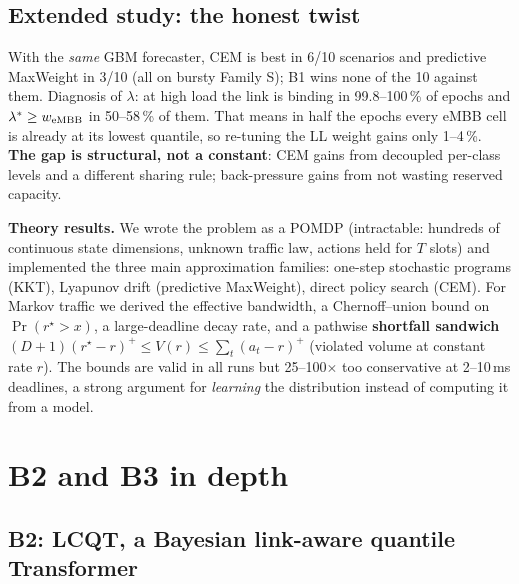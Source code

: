 \documentclass[11pt,a4paper]{article}
\newcommand{\rstar}{r^\star}
\begin{document}
\subsection{Extended study: the honest twist}

With the \emph{same} GBM forecaster, CEM is best in 6/10 scenarios and predictive MaxWeight in 3/10 (all on bursty Family S); B1 wins none of the 10 against them. Diagnosis of $\lambda$: at high load the link is binding in 99.8--100\,\% of epochs and $\lambda^\ast \ge w_{\rm eMBB}$ in 50--58\,\% of them. That means in half the epochs every eMBB cell is already at its lowest quantile, so re-tuning the LL weight gains only 1--4\,\%. \textbf{The gap is structural, not a constant}: CEM gains from decoupled per-class levels and a different sharing rule; back-pressure gains from not wasting reserved capacity.

\textbf{Theory results.} We wrote the problem as a POMDP (intractable: hundreds of continuous state dimensions, unknown traffic law, actions held for $T$ slots) and implemented the three main approximation families: one-step stochastic programs (KKT), Lyapunov drift (predictive MaxWeight), direct policy search (CEM). For Markov traffic we derived the effective bandwidth, a Chernoff--union bound on $\Pr(\rstar > x)$, a large-deadline decay rate, and a pathwise \textbf{shortfall sandwich} $(D+1)(\rstar - r)^+ \le V(r) \le \sum_t(a_t - r)^+$ (violated volume at constant rate $r$). The bounds are valid in all runs but 25--100$\times$ too conservative at 2--10\,ms deadlines, a strong argument for \emph{learning} the distribution instead of computing it from a model.

\section{B2 and B3 in depth}

\subsection{B2: LCQT, a Bayesian link-aware quantile Transformer}
\end{document}
